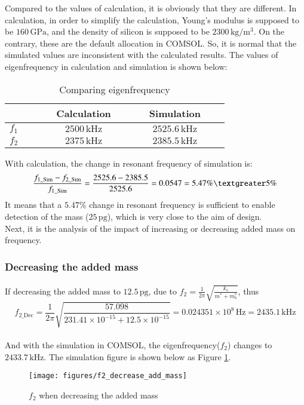 \documentclass[a4paper,12pt,reqno]{report}
\begin{document}
        Compared to the values of calculation, it is obviously that they are different.
        In calculation, in order to simplify the calculation, Young's modulus is supposed 
        to be $160\,\unit{\GPa}$, and the density of silicon is supposed to be $2300\,\unit{\kg/\m^3}$. 
        On the contrary, these are the default allocation in COMSOL. So, it is normal 
        that the simulated values are inconsistent with the calculated results.
        The values of eigenfrequency in calculation and simulation is shown below:
        \begin{table}[H]
            \centering
            \begin{tabular}{ccccccccccc}
                \hline
                      &&&& \textbf{Calculation}   &&&& \textbf{Simulation}     &  \\ \hline
                $f_1$ &&&& $2500\,\unit{\kHz}$              &&&& $2525.6\,\unit{\kHz}$             &  \\
                $f_2$ &&&& $2375\,\unit{\kHz}$              &&&& $2385.5\,\unit{\kHz}$             &  \\ \hline
            \end{tabular}
            \caption{Comparing eigenfrequency}
            \label{Table.Comparing_f_between_c_s}
        \end{table}
        With calculation, the change in resonant frequency of simulation is:
        $$\frac{f_{1\_\mathrm{Sim}}-f_{2\_\mathrm{\mathrm{Sim}}}}{f_{1\_\mathrm{Sim}}}=\frac{2525.6-2385.5}{2525.6}=0.0547=5.47\% \textgreater 5\%$$
        It means that a $5.47\%$ change in resonant frequency is sufficient to enable detection of the mass ($25\,\unit{\pg}$), which is very close to the aim of design.\\
        Next, it is the analysis of the impact of increasing or decreasing added mass on frequency.
        \subsubsection{Decreasing the added mass}
        \paragraph{}
        If decreasing the added mass to $12.5\,\unit{\pg}$, due to $f_2=\frac{1}{2\pi}\sqrt{\frac{k_s}{m^*+m_b^*}}$, thus
        $$f_{2\_\mathrm{Dec}}=\frac{1}{2\pi}\sqrt{\frac{57.098}{231.41\times10^{-15}+12.5\times10^{-15}}}=0.024351\times10^8\,\unit{\Hz}=2435.1\,\unit{\kHz}$$
        \paragraph{}
        And with the simulation in COMSOL, the eigenfrequency($f_2$) changes to $2433.7\,\unit{\kHz}$. The simulation figure is shown below as Figure \ref{Fig.f2_decrease_add_mass}.
        \begin{figure}[H]
            \centering
            \texttt{[image: figures/f2\_decrease\_add\_mass]}
            \caption{$f_2$ when decreasing the added mass}
            \label{Fig.f2_decrease_add_mass}
        \end{figure}
\end{document}
